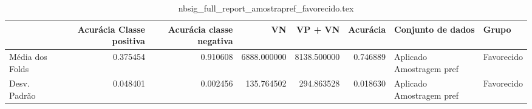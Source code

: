 \begin{table}
\centering
\caption{nbsig_full_report_amostrapref_favorecido.tex}
\label{nbsig_full_report_amostrapref_favorecido.tex}
\begin{tabular}{lrrrrrll}
\toprule
{}              &  Acurácia Classe positiva &  Acurácia classe negativa &          VN  &     VP + VN  &  Acurácia &         Conjunto de dados &       Grupo \\
\midrule
Média dos Folds &                  0.375454 &                  0.910608 &  6888.000000 &  8138.500000 &  0.746889 &  Aplicado Amostragem pref &  Favorecido \\
Desv. Padrão    &                  0.048401 &                  0.002456 &   135.764502 &   294.863528 &  0.018630 &  Aplicado Amostragem pref &  Favorecido \\
\bottomrule
\end{tabular}
\end{table}
